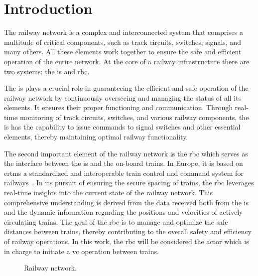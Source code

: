 \section{Introduction}
%
The railway network is a complex and interconnected system that comprises a multitude of critical components, such as track circuits, switches, signals, and many others. All these elements work together to ensure the safe and efficient operation of the entire network. At the core of a railway infrastructure there are two systems: the \gls{is} and \gls{rbc}.

\begin{comment}
	The \gls{is} is responsible to ensure efficient and safe operation of the railway network monitoring and managing the status of all the railway elements, ensuring that they are functioning and communicating properly. By constantly monitoring the status of track circuits, switches, and all the railway elements,  is able to send commands to signal switches and other essential railway components. 
\end{comment}

The \gls{is} plays a crucial role in guaranteeing the efficient and safe operation of the railway network by continuously overseeing and managing the status of all its elements. It ensures their proper functioning and communication. Through real-time monitoring of track circuits, switches, and various railway components, the \gls{is} has the capability to issue commands to signal switches and other essential elements, thereby maintaining optimal railway functionality.

The second important element of the railway network is the \gls{rbc} which serves as the interface between the \gls{is} and the on-board trains. In Europe, it is based on \gls{ertms} a standardized and interoperable train control and command system for railways~\cite{ertms}. In its pursuit of ensuring the secure spacing of trains, the \gls{rbc} leverages real-time insights into the current state of the railway network. This comprehensive understanding is derived from the data received both from the \gls{is} and the dynamic information regarding the positions and velocities of actively circulating trains. The goal of the \gls{rbc} is to manage and optimize the safe distances between trains, thereby contributing to the overall safety and efficiency of railway operations. In this work, the \gls{rbc} will be considered the actor which is in charge to initiate a \gls{vc} operation between trains.
%
\begin{figure}[!ht]
	\resizebox{\linewidth}{!}{}
	\caption{Railway network.}
	\label{fig:railwayNetwork}
\end{figure}
%

